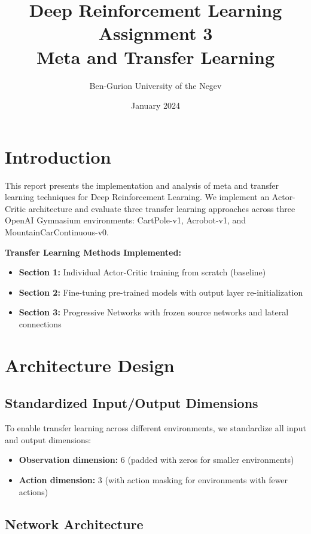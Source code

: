 \documentclass[11pt,a4paper]{article}
\title{Deep Reinforcement Learning Assignment 3\\Meta and Transfer Learning}
\author{Ben-Gurion University of the Negev}
\date{January 2024}
\begin{document}
\maketitle

\section{Introduction}

This report presents the implementation and analysis of meta and transfer learning techniques for Deep Reinforcement Learning. We implement an Actor-Critic architecture and evaluate three transfer learning approaches across three OpenAI Gymnasium environments: CartPole-v1, Acrobot-v1, and MountainCarContinuous-v0.

\textbf{Transfer Learning Methods Implemented:}
\begin{itemize}
    \item \textbf{Section 1:} Individual Actor-Critic training from scratch (baseline)
    \item \textbf{Section 2:} Fine-tuning pre-trained models with output layer re-initialization
    \item \textbf{Section 3:} Progressive Networks with frozen source networks and lateral connections
\end{itemize}

\section{Architecture Design}

\subsection{Standardized Input/Output Dimensions}

To enable transfer learning across different environments, we standardize all input and output dimensions:
\begin{itemize}
    \item \textbf{Observation dimension:} 6 (padded with zeros for smaller environments)
    \item \textbf{Action dimension:} 3 (with action masking for environments with fewer actions)
\end{itemize}

\subsection{Network Architecture}
\end{document}

